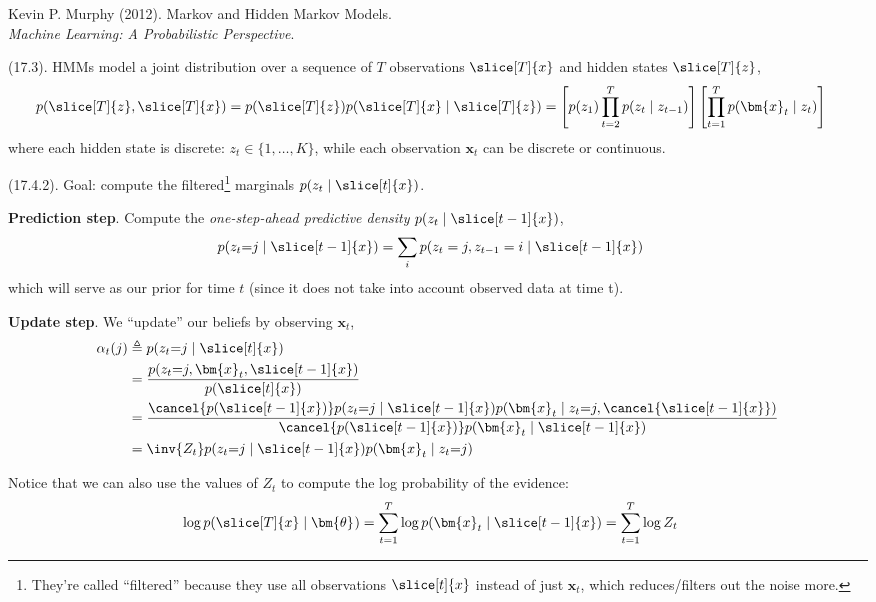 \documentclass[11pt]{article}
\renewcommand\vec[2][]{\bm{#2}_{#1}}
\newcommand\myspace[1][]{\vspace{#1\bigskipamount}}
\newcommand\p{\Needspace{10\baselineskip} \noindent}
\begin{document}

\vspace{-1.7em}
{\scriptsize Kevin P. Murphy (2012). Markov and Hidden Markov Models.\\ \textit{Machine Learning: A Probabilistic Perspective}.\\ }

\p {} (17.3). HMMs model a joint distribution over a sequence of $T$ observations $\slice[T]{x}$ and hidden states $\slice[T]{z}$,
\begin{align}
	p(\slice[T]{z}, \slice[T]{x})
		&= p(\slice[T]{z}) p(\slice[T]{x} \mid \slice[T]{z})
		= \left[ p(z_1) \prod_{t=2}^{T} p(z_t \mid z_{t-1})  \right]
			\left[ \prod_{t=1}^T p(\vec[t]{x} \mid z_t) \right]
\end{align}
where each hidden state is discrete: $z_t \in \{1, \ldots, K \}$, while each observation $\vec[t]{x}$ can be discrete or continuous.

\myspace
\p {} (17.4.2). Goal: compute the filtered\footnote{They're called ``filtered'' because they use all observations $\slice[t]{x}$ instead of just $\vec[t]{x}$, which reduces/filters out the noise more.} marginals $p(z_t \mid \slice[t]{x})$.
\begin{compactenum}
	\item \textbf{Prediction step}. Compute the \textit{one-step-ahead predictive density} $p(z_t \mid \slice[t-1]{x})$,
	\begin{align}
		p(z_t {=} j \mid \slice[t-1]{x})
			&= \sum_i p(z_t = j, z_{t-1} = i \mid \slice[t-1]{x}) 
	\end{align}
	which will serve as our prior for time $t$ (since it does not take into account observed data at time t). 
	
	\item \textbf{Update step}. We ``update'' our beliefs by observing $\vec[t]{x}$,
	\begin{align}
		\alpha_t(j)
			&\triangleq p(z_t {=} j \mid \slice[t]{x}) \\
			&= \frac{  p(z_t {=} j, \vec[t]{x}, \slice[t-1]{x}) }{  p(\slice[t]{x}) } \\
			&= \frac{ \cancel{ p(\slice[t-1]{x}) } p(z_t{=}j \mid \slice[t-1]{x}) p(\vec[t]{x} \mid z_t {=} j, \cancel{ \slice[t-1]{x}  }) }{
				\cancel{  p(\slice[t-1]{x}) } p(\vec[t]{x} \mid \slice[t-1]{x}) } \\
			&= \inv{Z_t} p(z_t {=} j \mid \slice[t-1]{x}) p(\vec[t]{x} \mid z_t {=} j)
	\end{align}
\end{compactenum}
Notice that we can also use the values of $Z_t$ to compute the log probability of the evidence:
\begin{align}
	\log p(\slice[T]{x} \mid \vec\theta)
		&= \sum_{t=1}^{T} \log p(\vec[t]{x} \mid \slice[t-1]{x}) 
		= \sum_{t=1}^T \log Z_t
\end{align}
\end{document}
